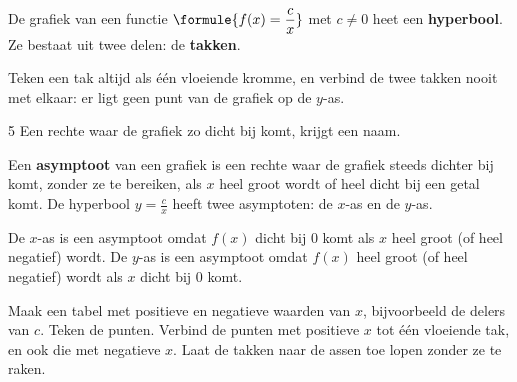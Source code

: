 \begin{theorie}
De grafiek van een functie $\formule{f(x) = \dfrac{c}{x}}$ met $c \neq 0$ heet een \textbf{\textcolor{accent}{hyperbool}}. Ze bestaat uit twee delen: de \textbf{\textcolor{accent}{takken}}.
\end{theorie}

Teken een tak altijd als één vloeiende kromme, en verbind de twee takken nooit met elkaar: er ligt geen punt van de grafiek op de $y$-as.

\begin{alleenvoor}{5}
Een rechte waar de grafiek zo dicht bij komt, krijgt een naam.

\begin{theorie}
Een \textbf{\textcolor{accent}{asymptoot}} van een grafiek is een rechte waar de grafiek steeds dichter bij komt, zonder ze te bereiken, als $x$ heel groot wordt of heel dicht bij een getal komt. De hyperbool $y = \tfrac cx$ heeft twee asymptoten: de $x$-as en de $y$-as.
\end{theorie}

De $x$-as is een asymptoot omdat $f(x)$ dicht bij $0$ komt als $x$ heel groot (of heel negatief) wordt. De $y$-as is een asymptoot omdat $f(x)$ heel groot (of heel negatief) wordt als $x$ dicht bij $0$ komt.
\end{alleenvoor}


\begin{werkwijze}
Maak een tabel met positieve en negatieve waarden van $x$, bijvoorbeeld de delers van $c$. Teken de punten. Verbind de punten met positieve $x$ tot één vloeiende tak, en ook die met negatieve $x$. Laat de takken naar de assen toe lopen zonder ze te raken.
\end{werkwijze}

